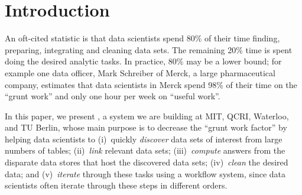 \section{Introduction}
\label{introduction}

An oft-cited statistic is that data scientists spend 80\% of their time finding, preparing, integrating and cleaning data sets. The remaining 20\% time is spent doing the desired analytic tasks.
 In practice, 80\% may be a lower bound; for example one data officer, Mark Schreiber of Merck, a large pharmaceutical company, estimates that data scientists in Merck spend 98\% of their time on the ``grunt work'' and only one hour per week on ``useful work''.

In this paper, we present \dcv, a system we are building at MIT, QCRI, Waterloo, and TU Berlin, whose main purpose is to decrease the ``grunt work factor'' by helping data scientists to 
(i)~quickly {\it discover} data sets of interest from large numbers of tables;
(ii)~{\it link} relevant data sets; %
(iii)~{\it compute} answers from the disparate data stores that host the discovered data sets;
(iv)~{\it clean} the desired data; and %
(v)~{\it iterate} through these tasks using a workflow system, since data scientists often iterate through these steps in different orders.


%
%
%
%
%
%
%
%
%
%


